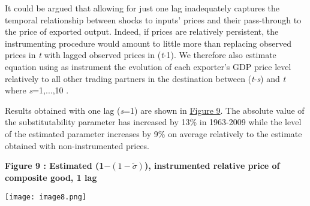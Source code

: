 \documentclass[12pt,twoside,a4paper,notitlepage]{article}
\begin{document}
{It could be argued that allowing for just one lag inadequately captures the temporal relationship between shocks to inputs' prices and their pass-through to the price of exported output. Indeed, if prices are relatively persistent, the instrumenting procedure would amount to little more than replacing observed prices in \textit{t} with lagged observed prices in (\textit{t}-1). We therefore also estimate equation {\hyperref[ref-002]{ }} using as instrument the evolution of each exporter's GDP price level relatively to all other trading partners in the destination between (\textit{t}-\textit{s}) and \textit{t} where \textit{s}=1,...,10%
.

Results obtained with one lag (\textit{s}=1) are shown in {\hyperref[ref-010]{Figure 9}}. The absolute value of the substitutability parameter has increased by 13\% in 1963-2009 while the level of the estimated parameter increases by 9\% on average relatively to the estimate obtained with non-instrumented prices. 

\textbf{ \label{ref-010}Figure 9 : Estimated (1${-}$$(1-\tilde{\sigma })$), instrumented relative price of composite good, 1 lag}

\texttt{[image: image8.png]} 

}
\end{document}
